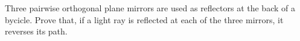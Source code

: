 Three pairwise orthogonal plane mirrors are used as reflectors at the back of a bycicle. Prove that, if a light ray is reflected at each of the three mirrors, it reverses its path.
